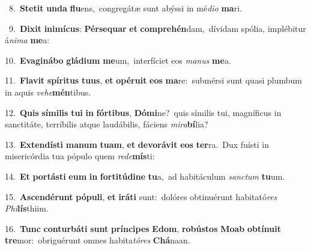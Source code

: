 {{\numbfont\textcolor{\numbcolor}{~8.}}~\-\textbf{Ste}\-\textbf{tit} \textbf{un}\-\textbf{da} \textbf{flu}\-ens,~\star congregátæ sunt abýssi in mé\-\textit{di}\-\textit{o} \textbf{ma}\-ri.\par
{\numbfont\textcolor{\numbcolor}{~9.}}~\-\textbf{Di}\-\textbf{xit} \textbf{in}\-\textbf{i}\textbf{mí}\textbf{cus}: \textbf{Pér}\-\textbf{se}\textbf{quar} \textbf{et} \textbf{com}\-\textbf{pre}\textbf{hén}dam,~\star dívidam spólia, implébitur á\-\textit{ni}\-\textit{ma} \textbf{me}\-a:\par
{\numbfont\textcolor{\numbcolor}{10.}}~\-\textbf{E}\-\textbf{va}\textbf{gi}\textbf{ná}\textbf{bo} \textbf{glá}\-\textbf{di}\textbf{um} \textbf{me}\-um,~\star interfíciet eos \textit{ma}\-\textit{nus} \textbf{me}\-a.\par
{\numbfont\textcolor{\numbcolor}{11.}}~\-\textbf{Fla}\-\textbf{vit} \textbf{spí}\-\textbf{ri}\textbf{tus} \textbf{tu}\-\textbf{us}, \textbf{et} \textbf{o}\-\textbf{pé}\textbf{ru}\textbf{it} \textbf{e}\-\textbf{os} \textbf{ma}\-re:~\star submérsi sunt quasi plumbum in aquis \textit{ve}\-\textit{he}\textbf{mén}tibus.\par
{\numbfont\textcolor{\numbcolor}{12.}}~\textbf{Quis} \textbf{sí}\-\textbf{mi}\textbf{lis} \textbf{tu}\-\textbf{i} \textbf{in} \textbf{fór}\-\textbf{ti}\textbf{bus}, \textbf{Dó}\-\textbf{mi}ne?~\star quis símilis tui, magníficus in sanctitáte, terríbilis atque laudábilis, fáciens \textit{mi}\-\textit{ra}\textbf{bí}lia?\par
{\numbfont\textcolor{\numbcolor}{13.}}~\-\textbf{Ex}\-\textbf{ten}\textbf{dís}\textbf{ti} \textbf{ma}\-\textbf{num} \textbf{tu}\-\textbf{am}, \textbf{et} \textbf{de}\-\textbf{vo}\textbf{rá}\textbf{vit} \textbf{e}\-\textbf{os} \textbf{ter}\-ra.~\star Dux fuísti in misericórdia tua pópulo quem \textit{red}\-\textit{e}\textbf{mís}ti:\par
{\numbfont\textcolor{\numbcolor}{14.}}~\textbf{Et} \textbf{por}\-\textbf{tás}\textbf{ti} \textbf{e}\-\textbf{um} \textbf{in} \textbf{for}\-\textbf{ti}\textbf{tú}\textbf{di}\textbf{ne} \textbf{tu}\-a,~\star ad habitáculum \textit{sanc}\-\textit{tum} \textbf{tu}\-um.\par
{\numbfont\textcolor{\numbcolor}{15.}}~\-\textbf{A}\-\textbf{scen}\textbf{dé}\textbf{runt} \textbf{pó}\-\textbf{pu}\textbf{li}, \textbf{et} \textbf{i}\-\textbf{rá}\textbf{ti} sunt:~\star dolóres obtinuérunt habitató\textit{res} \textit{Phi}\-\textbf{lís}thiim.\par
{\numbfont\textcolor{\numbcolor}{16.}}~\textbf{Tunc} \textbf{con}\-\textbf{tur}\textbf{bá}\textbf{ti} \textbf{sunt} \textbf{prín}\-\textbf{ci}\textbf{pes} \textbf{E}\-\textbf{dom}, \textbf{ro}\-\textbf{bús}\textbf{tos} \textbf{Mo}\-\textbf{ab} \textbf{ob}\-\textbf{tí}\textbf{nu}\textbf{it} \textbf{tre}\-mor:~\star obriguérunt omnes habita\-\textit{tó}\-\textit{res} \textbf{Chá}\-naan.\par
}
